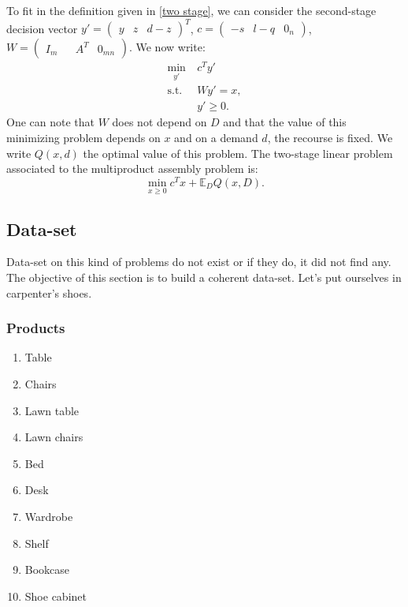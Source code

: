 \documentclass{amsart}
\begin{document}
To fit in the definition given in \ref{two stage}, we can consider the second-stage decision vector $y'=\begin{pmatrix} y &z&d-z\end{pmatrix}^T$, $c=\begin{pmatrix}-s & l-q & 0_n\end{pmatrix}$, $W=\begin{pmatrix} I_m &  & A^T &0_{mn}\end{pmatrix}$. We now write:
\begin{align*}
    \min_{y'} \:&c^Ty' \\
     \text{s.t. } &Wy'=x, \\
     & y'\geq0.
\end{align*}
One can note that $W$ does not depend on $D$ and that the value of this minimizing problem depends on $x$ and on a demand $d$, the recourse is fixed. We write $Q\left(x,d\right)$ the optimal value of this problem. The two-stage linear problem associated to the multiproduct assembly problem is:
$$\min_{x\geq0}c^Tx+\mathbb{E}_DQ\left(x,D\right).$$
\subsection{Data-set}
Data-set on this kind of problems do not exist or if they do, it did not find any. The objective of this section is to build a coherent data-set. Let's put ourselves in carpenter's shoes.
\subsubsection{Products}
\begin{enumerate}
    \item Table
    \item Chairs
    \item Lawn table
    \item Lawn chairs
    \item Bed
    \item Desk
    \item Wardrobe
    \item Shelf
    \item Bookcase
    \item Shoe cabinet
\end{enumerate}
\end{document}
